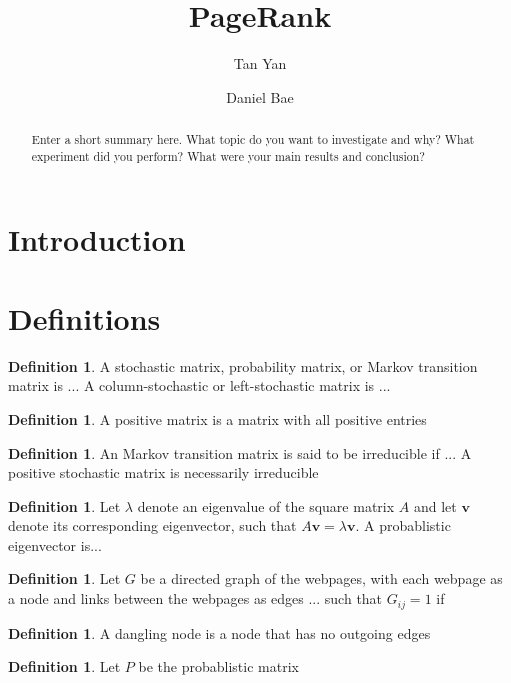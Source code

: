 \documentclass[11pt]{article}
\title{PageRank}
\author{Tan Yan \and Daniel Bae}
\theoremstyle{definition}
\newtheorem{definition}[theorem]{Definition}
\renewcommand{\vec}[1]{\mathbf{#1}}
\begin{document}
\maketitle
\begin{abstract}
Enter a short summary here. What topic do you want to investigate and why? What experiment did you perform? What were your main results and conclusion?
\end{abstract}

\section{Introduction}

\section{Definitions}
\begin{definition}
    A stochastic matrix, probability matrix, or Markov transition matrix is ...
    A column-stochastic or left-stochastic matrix is ...
\end{definition}

\begin{definition}
    A positive matrix is a matrix with all positive entries
\end{definition}

\begin{definition}
    An Markov transition matrix is said to be irreducible if ...
    A positive stochastic matrix is necessarily irreducible
\end{definition}

\begin{definition}
    Let $\lambda$ denote an eigenvalue of the square matrix $A$ and let $\vec{v}$ denote its corresponding eigenvector, such that $A \vec{v} = \lambda \vec{v}$.
    A probablistic eigenvector is...
\end{definition}

\begin{definition}
    Let $G$ be a directed graph of the webpages, with each webpage as a node and links between the webpages as edges ... such that $G_{ij} = 1$ if 
\end{definition}

\begin{definition}
    A dangling node is a node that has no outgoing edges
\end{definition}

\begin{definition}
    Let $P$ be the probablistic matrix 
\end{definition}
\end{document}
